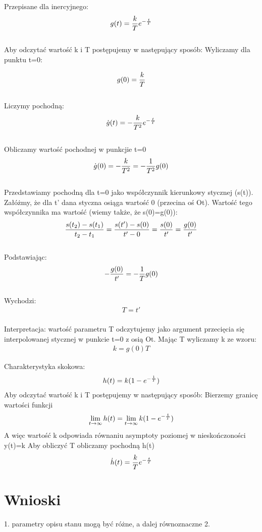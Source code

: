 \documentclass[a4paper,10pt]{article}
\begin{document}
Przepisane dla inercyjnego:
	\begin{eqnarray} 
		g(t)={k \over T} e^{-{t \over T}}
	\end{eqnarray}\\
	
Aby odczytać wartość k i T postępujemy w następujący sposób:
Wyliczamy dla punktu t=0:

	\begin{eqnarray} 
		g(0)={k \over T}
	\end{eqnarray}\\
	Liczymy pochodną:
	\begin{eqnarray} 
		\dot{g}(t)=-{k \over T^{2}} e^{-{t \over T}}
	\end{eqnarray}\\
	Obliczamy wartość pochodnej w punkcjie t=0
	\begin{eqnarray} 
		\dot{g}(0)=-{k \over T^{2}}=-{1 \over T^{2}}g(0)
	\end{eqnarray}\\
Przedstawiamy pochodną dla t=0 jako współczynnik kierunkowy stycznej (s(t)). Załóżmy, że dla t’
dana styczna osiąga wartość 0 (przecina oś Ot). Wartość tego współczynnika ma wartość (wiemy
także, że s(0)=g(0)):
	\begin{eqnarray} 
		{s(t_{2})- s(t_{1}) \over {t_{2} -t_{1}}}={s(t')- s(0) \over {t' -0}}={s(0) \over t'}={g(0) \over t'}
	\end{eqnarray}\\
	Podstawiając:
	\begin{eqnarray} 
		-{g(0) \over t'}= - {1 \over T} g(0)
	\end{eqnarray}\\
	Wychodzi:
	\begin{eqnarray} 
		T=t'
	\end{eqnarray}\\
Interpretacja: wartość parametru T odczytujemy jako argument przecięcia się interpolowanej stycznej
w punkcie t=0 z osią Ot. Mając T wyliczamy k ze wzoru: 
	\begin{eqnarray} 
		k = g (0)T
	\end{eqnarray}
	
	Charakterystyka skokowa:
	\begin{eqnarray} 
			h(t)= k(1- e^{-{1 \over T}})
	\end{eqnarray}		
Aby odczytać wartość k i T postępujemy w następujący sposób:
Bierzemy granicę wartości funkcji
	\begin{eqnarray} 
		\lim_{t \to \infty}{h(t)} = \lim_{t \to \infty}{k(1-e^{-{t \over T}})} 
	\end{eqnarray}	
A więc wartość k odpowiada równaniu asymptoty poziomej w nieskończoności y(t)=k
Aby obliczyć T obliczamy pochodną h(t)
	\begin{eqnarray} 
		\dot{h}(t)={k \over T}e^{-{t \over T}}
	\end{eqnarray}	

\section{Wnioski}\label{sec:wnioski}

1. parametry opisu stanu mogą być różne, a dalej równoznaczne
2. 
\end{document}
